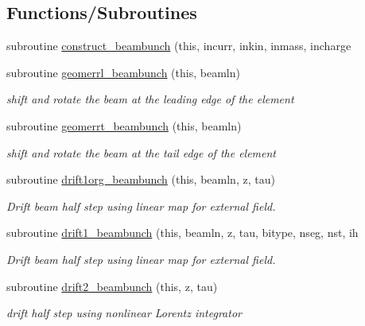 \subsection*{Functions/\+Subroutines}
\begin{DoxyCompactItemize}
\item 
subroutine \mbox{\hyperlink{namespacebeambunchclass_a1605e527eb41043dc5962da1e3bb5159}{construct\+\_\+beambunch}} (this, incurr, inkin, inmass, incharge
\item 
subroutine \mbox{\hyperlink{namespacebeambunchclass_aea8cfefa2f70ade95202cc40f015f7bf}{geomerrl\+\_\+beambunch}} (this, beamln)
\begin{DoxyCompactList}\small\item\em shift and rotate the beam at the leading edge of the element \end{DoxyCompactList}\item 
subroutine \mbox{\hyperlink{namespacebeambunchclass_ab2f6f9e95d5786dab15c1b73f305e349}{geomerrt\+\_\+beambunch}} (this, beamln)
\begin{DoxyCompactList}\small\item\em shift and rotate the beam at the tail edge of the element \end{DoxyCompactList}\item 
subroutine \mbox{\hyperlink{namespacebeambunchclass_a3be2b49f0fef567493258758c44fffd6}{drift1org\+\_\+beambunch}} (this, beamln, z, tau)
\begin{DoxyCompactList}\small\item\em Drift beam half step using linear map for external field. \end{DoxyCompactList}\item 
subroutine \mbox{\hyperlink{namespacebeambunchclass_a212c0d38a812d95f238d7da7f29ac17c}{drift1\+\_\+beambunch}} (this, beamln, z, tau, bitype, nseg, nst, ih
\begin{DoxyCompactList}\small\item\em Drift beam half step using linear map for external field. \end{DoxyCompactList}\item 
subroutine \mbox{\hyperlink{namespacebeambunchclass_a6e3aecf1a2cf3d54950c09c603c2f11c}{drift2\+\_\+beambunch}} (this, z, tau)
\begin{DoxyCompactList}\small\item\em drift half step using nonlinear Lorentz integrator \end{DoxyCompactList}\item 

\end{DoxyCompactItemize}
